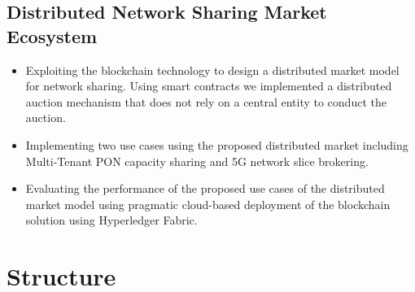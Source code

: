 \subsection{Distributed Network Sharing Market Ecosystem}
\begin{itemize}


\item Exploiting the blockchain technology to design a distributed market model for network sharing. Using smart contracts we implemented a distributed auction mechanism that does not rely on a central entity to conduct the auction.

\item Implementing two use cases using the proposed distributed market including Multi-Tenant \ac{PON} capacity sharing and \ac{5G} network slice brokering.

\item Evaluating the performance of the proposed use cases of the distributed market model using pragmatic cloud-based deployment of the blockchain solution using Hyperledger Fabric.



\end{itemize}



\section{Structure}

